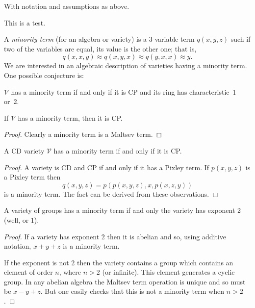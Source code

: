 With notation and assumptions as above.

\begin{theorem}
This is a test.
\end{theorem}







%




A \emph{minority term} (for an algebra or variety) is a 
3-variable term $q(x,y,z)$ such if two of the variables
are equal, its value is the other one; that is, 
\[
q(x,x,y) \approx q(x,y,x) \approx q(y,x,x) \approx y.
\]
We are interested in an algebraic description of varieties having
a minority term. One possible conjecture is:
\begin{conjecture}
$\mathcal V$ has a minority term if and only if it is CP and its
ring has characteristic~1 or~2.
\end{conjecture}



\begin{fact}
If $\mathcal V$ has a minority term, then it is CP.
\end{fact}

\begin{proof}
Clearly a minority term is a Maltsev term.
\end{proof}

\begin{fact}
A CD variety $\mathcal V$ has a minority term if and
only if it is CP.
\end{fact}

\begin{proof}
A variety is CD and CP if and only if it has a Pixley term. 
If $p(x,y,z)$ is a Pixley term then 
\[
q(x,y,z) = p(p(x,y,z),x,p(x,z,y))
\]
is a minority term. The fact can be derived from these
observations.
\end{proof}

\begin{fact}
A variety of groups has a minority term if and only
the variety has exponent 2 (well, or 1).
\end{fact}

\begin{proof}
If a variety has exponent 2 then it is abelian and so,
using additive notation, $x + y + z$ is a minority term.

If the exponent is not 2 then the variety contains a group
which contains an element of order $n$, where $n > 2$ (or 
infinite). This element generates a cyclic group. In any
abelian algebra the Maltsev term operation is unique and so
must be $x - y + z$. But one easily checks that this is not
a minority term when $n > 2$.
\end{proof}

